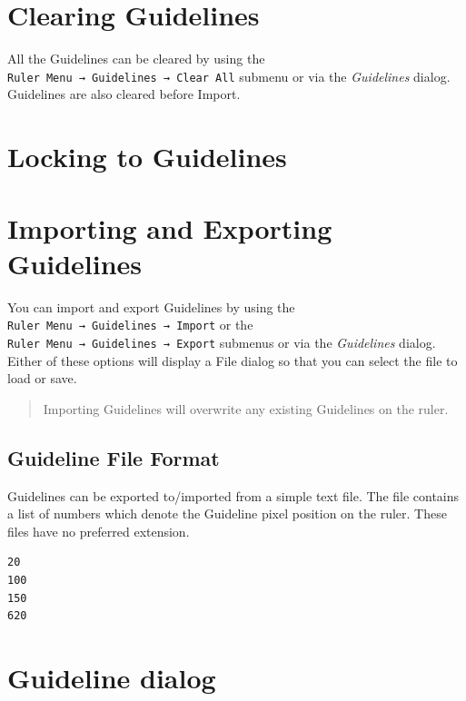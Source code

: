 \documentclass[
]{book}
\begin{document}
\hypertarget{clearing-guidelines}{%
\section{Clearing Guidelines}\label{clearing-guidelines}}

All the Guidelines can be cleared by using the \texttt{Ruler\ Menu\ →\ Guidelines\ →\ Clear\ All} submenu or via the \emph{Guidelines} dialog.
Guidelines are also cleared before Import.

\hypertarget{locking-to-guidelines}{%
\section{Locking to Guidelines}\label{locking-to-guidelines}}

\hypertarget{importing-and-exporting-guidelines}{%
\section{Importing and Exporting Guidelines}\label{importing-and-exporting-guidelines}}

You can import and export Guidelines by using the \texttt{Ruler\ Menu\ →\ Guidelines\ →\ Import} or the \texttt{Ruler\ Menu\ →\ Guidelines\ →\ Export} submenus or via the \emph{Guidelines} dialog.
Either of these options will display a File dialog so that you can select the file to load or save.

\begin{quote}
Importing Guidelines will overwrite any existing Guidelines on the ruler.
\end{quote}

\hypertarget{guideline-file-format}{%
\subsection{Guideline File Format}\label{guideline-file-format}}

Guidelines can be exported to/imported from a simple text file.
The file contains a list of numbers which denote the Guideline pixel position on the ruler.
These files have no preferred extension.

\begin{verbatim}
20
100
150
620
\end{verbatim}

\hypertarget{guideline-dialog}{%
\section{Guideline dialog}\label{guideline-dialog}}
\end{document}
